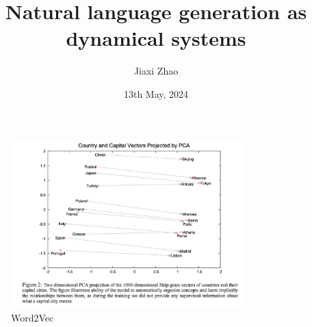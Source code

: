 \documentclass{beamer}
\title[NLG]{Natural language generation as dynamical systems}
\author[J. Zhao]{Jiaxi Zhao}
\date{13th May, 2024}
\begin{document}
\par \setlength{\parindent}{2em}

\begin{frame}
\titlepage

\end{frame}

\begin{frame}
	
\end{frame}

\begin{frame}[]
	\begin{figure}
		\centering
		\includegraphics[width=0.8\textwidth]{fig/word2vec.png}
		\caption{Word2Vec}
	\end{figure}
\end{frame}
\end{document}
